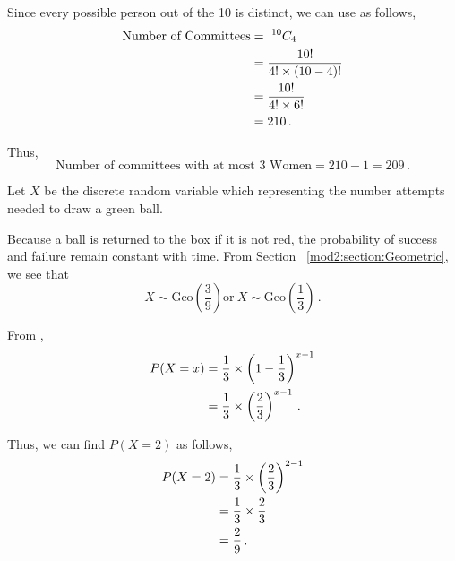 \begin{subquestions}
Since every possible person out of the 10 is distinct, we can use  as follows,
\begin{align}
	\text{Number of Committees} & = ~ ^{10}C_4 \nonumber \\
	                            & = \frac{10!}{4!\times (10-4)!} \nonumber \\
	                            & = \frac{10!}{4! \times 6!} \nonumber \\
	                            & = 210 \,.
\end{align}

Thus,
\begin{equation}
	\text{Number of committees with at most 3 Women} = 210 - 1 = 209 \,.
\end{equation}


\subquestion

Let $X$ be the discrete random variable which representing the number attempts needed to draw a green ball.

\begin{subsubquestions}
	
\subsubquestion
Because a ball is returned to the box if it is not red, the probability of success and failure remain constant with time. From Section ~\ref{mod2:section:Geometric}, we see that
\begin{equation}
	X \sim \text{Geo} \left(\frac{3}{9}\right) \text{or} ~ X \sim \text{Geo} \left(\frac{1}{3}\right) \,.
\end{equation}


\subsubquestion

\begin{subsubsubquestions}
	
\subsubsubquestion

From ,
\begin{align}
	P(X = x) & = \frac{1}{3} \times \left(1-\frac{1}{3} \right)^{x-1} \nonumber \\
				& = \frac{1}{3} \times \left(\frac{2}{3} \right)^{x-1} \,.
\end{align}	
	
Thus, we can find $P(X=2)$ as follows,
\begin{align}
	P(X=2) & = \frac{1}{3} \times \left(\frac{2}{3} \right)^{2-1} \nonumber \\
	       & = \frac{1}{3} \times \frac{2}{3}  \nonumber \\
	       & = \frac{2}{9} \,.
\end{align}


\end{subsubsubquestions}
\end{subsubquestions}
\end{subquestions}

